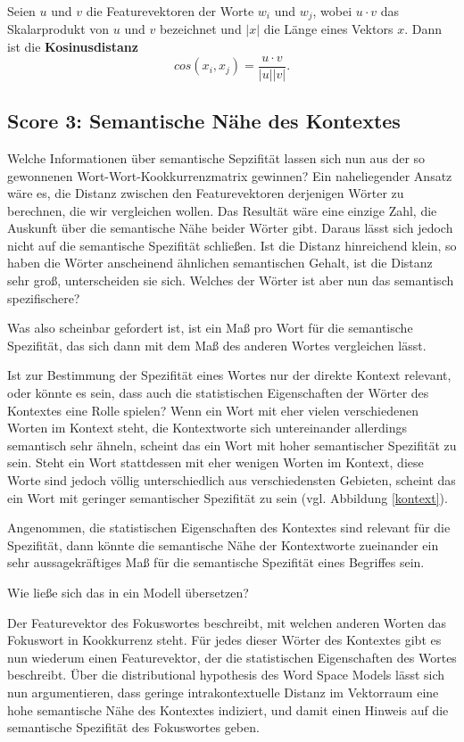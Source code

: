 \documentclass[11pt,numbers=noenddot]{scrartcl}
\begin{document}
Seien $u$ und $v$ die Featurevektoren der Worte $w_i$ und $w_j$, wobei $u \cdot v$ das Skalarprodukt von $u$ und $v$ bezeichnet und $|x|$ die Länge eines Vektors $x$. Dann ist die \textbf{Kosinusdistanz}
$$
    cos(x_i, x_j) = \frac{u \cdot v}{|u||v|}.
$$

\subsection{Score 3: Semantische Nähe des Kontextes} \label{mdcs}

Welche Informationen über semantische Sepzifität lassen sich nun aus der so gewonnenen Wort-Wort-Kookkurrenzmatrix gewinnen? Ein naheliegender Ansatz wäre es, die Distanz zwischen den Featurevektoren derjenigen Wörter zu berechnen, die wir vergleichen wollen. Das Resultät wäre eine einzige Zahl, die Auskunft über die semantische Nähe beider Wörter gibt. Daraus lässt sich jedoch nicht auf die semantische Spezifität schließen. Ist die Distanz hinreichend klein, so haben die Wörter anscheinend ähnlichen semantischen Gehalt, ist die Distanz sehr groß, unterscheiden sie sich. Welches der Wörter ist aber nun das semantisch spezifischere?

Was also scheinbar gefordert ist, ist ein Maß pro Wort für die semantische Spezifität, das sich dann mit dem Maß des anderen Wortes vergleichen lässt.

Ist zur Bestimmung der Spezifität eines Wortes nur der direkte Kontext relevant, oder könnte es sein, dass auch die statistischen Eigenschaften der Wörter des Kontextes eine Rolle spielen? Wenn ein Wort mit eher vielen verschiedenen Worten im Kontext steht, die Kontextworte sich untereinander allerdings semantisch sehr ähneln, scheint das ein Wort mit hoher semantischer Spezifität zu sein. Steht ein Wort stattdessen mit eher wenigen Worten im Kontext, diese Worte sind jedoch völlig unterschiedlich aus verschiedensten Gebieten, scheint das ein Wort mit geringer semantischer Spezifität zu sein (vgl. Abbildung \ref{kontext}).

Angenommen, die statistischen Eigenschaften des Kontextes sind relevant für die Spezifität, dann könnte die semantische Nähe der Kontextworte zueinander ein sehr aussagekräftiges Maß für die semantische Spezifität eines Begriffes sein.

Wie ließe sich das in ein Modell übersetzen?

Der Featurevektor des Fokuswortes beschreibt, mit welchen anderen Worten das Fokuswort in Kookkurrenz steht. Für jedes dieser Wörter des Kontextes gibt es nun wiederum einen Featurevektor, der die statistischen Eigenschaften des Wortes beschreibt. Über die distributional hypothesis des Word Space Models lässt sich nun argumentieren, dass geringe intrakontextuelle Distanz im Vektorraum eine hohe semantische Nähe des Kontextes indiziert, und damit einen Hinweis auf die semantische Spezifität des Fokuswortes geben.
\end{document}

